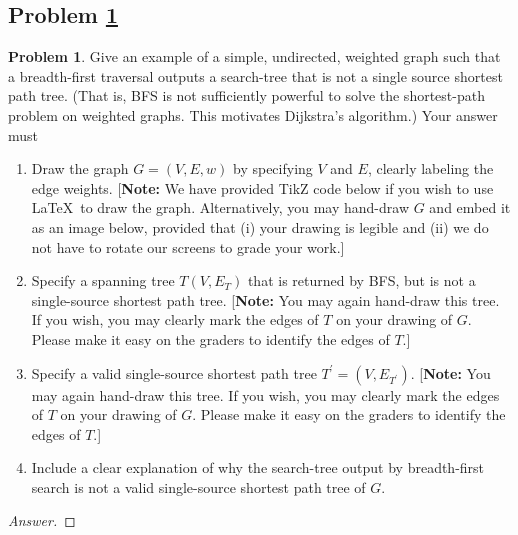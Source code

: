 \documentclass[11pt]{article}
\theoremstyle{definition}
\theoremstyle{definition}
\newtheorem{required}{Problem}
\theoremstyle{definition}
\begin{document}
\newpage
\subsection{Problem \ref{DFS4}}
\begin{required} \label{DFS4}
	Give an example of a simple, undirected, weighted graph such that a breadth-first traversal outputs a search-tree that is not a single source shortest path tree. (That is, BFS is not sufficiently powerful to solve the shortest-path problem on weighted graphs. This motivates Dijkstra's algorithm.) 
	Your answer must
	\begin{enumerate}[label=(\alph*)]
		\item Draw the graph $G = (V,E, w)$ by specifying $V$ and $E$, clearly labeling the edge weights.  [\textbf{Note:} We have provided TikZ code below if you wish to use \LaTeX \ to draw the graph. Alternatively, you may hand-draw $G$ and embed it as an image below, provided that (i) your drawing is legible and (ii) we do not have to rotate our screens to grade your work.]
		\item Specify a spanning tree $T(V, E_{T})$ that is returned by BFS, but is not a single-source shortest path tree. [\textbf{Note:} You may again hand-draw this tree. If you wish, you may clearly mark the edges of $T$ on your drawing of $G$. Please make it easy on the graders to identify the edges of $T$.] 

		\item Specify a valid single-source shortest path tree $T^{\prime} = (V,E_{T^{\prime}})$.  [\textbf{Note:} You may again hand-draw this tree. If you wish, you may clearly mark the edges of $T$ on your drawing of $G$. Please make it easy on the graders to identify the edges of $T$.] 

		\item Include a clear explanation of why the search-tree output by breadth-first search is not a valid single-source shortest path tree of $G$.
	\end{enumerate}
\end{required}


\begin{proof}[Answer]
\end{proof}
\end{document}
